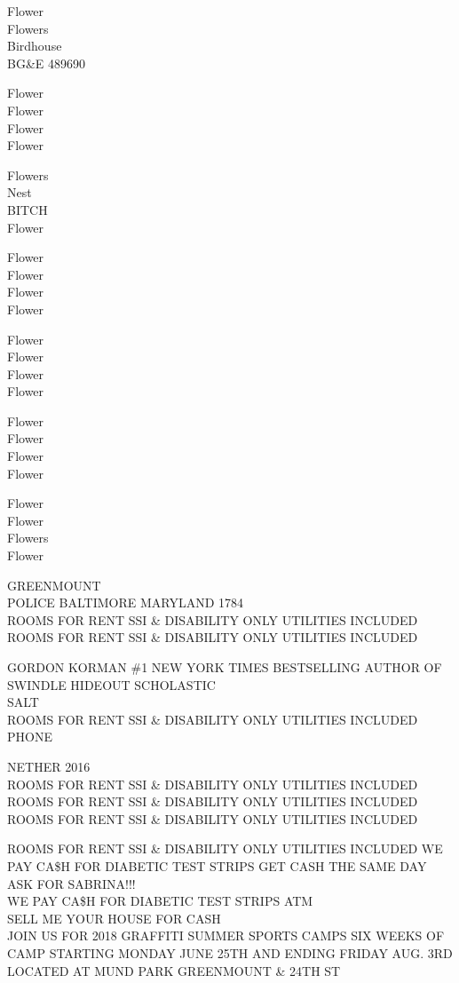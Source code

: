 \documentclass[10pt,letterpaper]{article}
\begin{document}
Flower\\
Flowers\\
Birdhouse\\
BG\&E 489690

Flower\\
Flower\\
Flower\\
Flower

Flowers\\
Nest\\
BITCH\\
Flower

Flower\\
Flower\\
Flower\\
Flower

Flower\\
Flower\\
Flower\\
Flower

Flower\\
Flower\\
Flower\\
Flower

Flower\\
Flower\\
Flowers\\
Flower

GREENMOUNT\\
POLICE BALTIMORE MARYLAND 1784\\
ROOMS FOR RENT SSI \& DISABILITY ONLY UTILITIES INCLUDED\\
ROOMS FOR RENT SSI \& DISABILITY ONLY UTILITIES INCLUDED

GORDON KORMAN \#1 NEW YORK TIMES BESTSELLING AUTHOR OF SWINDLE HIDEOUT SCHOLASTIC\\
SALT\\
ROOMS FOR RENT SSI \& DISABILITY ONLY UTILITIES INCLUDED\\
PHONE

NETHER 2016\\
ROOMS FOR RENT SSI \& DISABILITY ONLY UTILITIES INCLUDED\\
ROOMS FOR RENT SSI \& DISABILITY ONLY UTILITIES INCLUDED\\
ROOMS FOR RENT SSI \& DISABILITY ONLY UTILITIES INCLUDED

ROOMS FOR RENT SSI \& DISABILITY ONLY UTILITIES INCLUDED WE PAY CA\$H FOR DIABETIC TEST STRIPS GET CASH THE SAME DAY ASK FOR SABRINA!!!\\
WE PAY CA\$H FOR DIABETIC TEST STRIPS ATM\\
SELL ME YOUR HOUSE FOR CASH\\
JOIN US FOR 2018 GRAFFITI SUMMER SPORTS CAMPS SIX WEEKS OF CAMP STARTING MONDAY JUNE 25TH AND ENDING FRIDAY AUG. 3RD LOCATED AT MUND PARK GREENMOUNT \& 24TH ST
\end{document}
